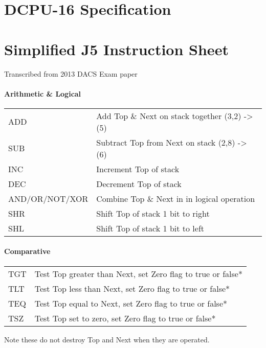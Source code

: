 \chapter{DCPU-16 Specification}\label{ch:dcpuspec}

\chapter{Simplified J5 Instruction Sheet}\label{ch:j5spec}
Transcribed from 2013 DACS Exam paper
\subsubsection{Arithmetic \& Logical}
\begingroup
\ttfamily
\begin{tabularx}{0.95\textwidth}{l X}
  ADD & Add Top \& Next on stack together   (3,2) -> (5) \\
  SUB & Subtract Top from Next on stack   (2,8) -> (6) \\
  INC & Increment Top of stack \\
  DEC & Decrement Top of stack \\
  AND/OR/NOT/XOR & Combine Top \& Next in in logical operation \\
  SHR & Shift Top of stack 1 bit to right \\
  SHL & Shift Top of stack 1 bit to left \\
\end{tabularx}
\endgroup

\subsubsection{Comparative}
\begingroup
\ttfamily
\begin{tabularx}{0.95\textwidth}{l X}
  TGT & Test Top greater than Next, set Zero flag to true or false* \\
  TLT & Test Top less than Next, set Zero flag to true or false* \\
  TEQ & Test Top equal to Next, set Zero flag to true or false* \\
  TSZ & Test Top set to zero, set Zero flag to true or false* \\
\end{tabularx}
\endgroup

\hfill*Note these do not destroy Top and Next when they are operated.

